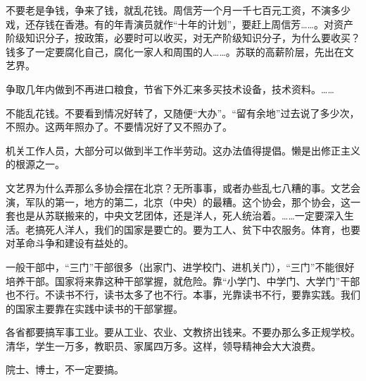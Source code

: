 不要老是争钱，争来了钱，就乱花钱。周信芳一个月一千七百元工资，不演多少戏，还存钱在香港。有的年青演员就作“十年的计划”，要赶上周信芳……。对资产阶级知识分子，按政策，必要时可以收买，对无产阶级知识分子，为什么要收买？钱多了一定要腐化自己，腐化一家人和周围的人……。苏联的高薪阶层，先出在文艺界。

争取几年内做到不再进口粮食，节省下外汇来多买技术设备，技术资料。……

不能乱花钱。不要看到情况好转了，又随便“大办”。“留有余地”过去说了多少次，不照办。这两年照办了。不要情况好了又不照办了。

机关工作人员，大部分可以做到半工作半劳动。这办法值得提倡。懒是出修正主义的根源之一。

文艺界为什么弄那么多协会摆在北京？无所事事，或者办些乱七八糟的事。文艺会演，军队的第一，地方的第二，北京（中央）的最糟。这个协会，那个协会，这一套也是从苏联搬来的，中央文艺团体，还是洋人，死人统治着。……一定要深入生活。老搞死人洋人，我们的国家是要亡的。要为工人、贫下中农服务。体育，也要对革命斗争和建设有益处的。

一般干部中，“三门”干部很多（出家门、进学校门、进机关门），“三门”不能很好培养干部。国家将来靠这种干部掌握，就危险。靠“小学门、中学门、大学门”干部也不行。不读书不行，读书太多了也不行。本事，光靠读书不行，要靠实践。我们的国家主要靠在实践中读书的干部掌握。

各省都要搞军事工业。要从工业、农业、文教挤出钱来。不要办那么多正规学校。清华，学生一万多，教职员、家属四万多。这样，领导精神会大大浪费。

院士、博士，不一定要搞。


